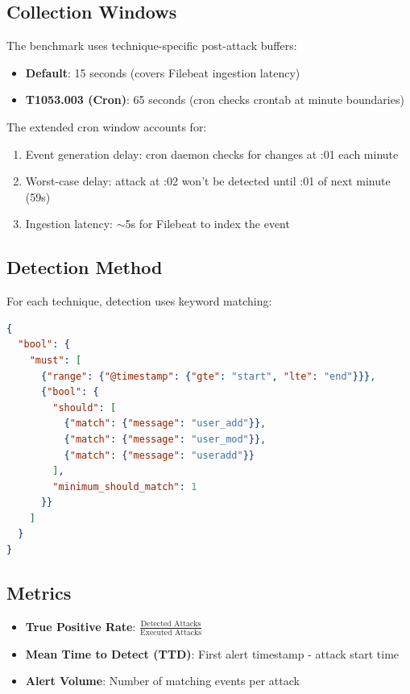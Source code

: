 \documentclass[11pt,a4paper]{article}
\begin{document}
\subsection{Collection Windows}

The benchmark uses technique-specific post-attack buffers:

\begin{itemize}
    \item \textbf{Default}: 15 seconds (covers Filebeat ingestion latency)
    \item \textbf{T1053.003 (Cron)}: 65 seconds (cron checks crontab at minute boundaries)
\end{itemize}

The extended cron window accounts for:
\begin{enumerate}
    \item Event generation delay: cron daemon checks for changes at :01 each minute
    \item Worst-case delay: attack at :02 won't be detected until :01 of next minute (59s)
    \item Ingestion latency: $\sim$5s for Filebeat to index the event
\end{enumerate}

\subsection{Detection Method}

For each technique, detection uses keyword matching:

\begin{lstlisting}[language=json,caption={Example: T1136.001 Detection Query}]
{
  "bool": {
    "must": [
      {"range": {"@timestamp": {"gte": "start", "lte": "end"}}},
      {"bool": {
        "should": [
          {"match": {"message": "user_add"}},
          {"match": {"message": "user_mod"}},
          {"match": {"message": "useradd"}}
        ],
        "minimum_should_match": 1
      }}
    ]
  }
}
\end{lstlisting}

\subsection{Metrics}

\begin{itemize}
    \item \textbf{True Positive Rate}: $\frac{\text{Detected Attacks}}{\text{Executed Attacks}}$
    \item \textbf{Mean Time to Detect (TTD)}: First alert timestamp - attack start time
    \item \textbf{Alert Volume}: Number of matching events per attack
\end{itemize}
\end{document}
